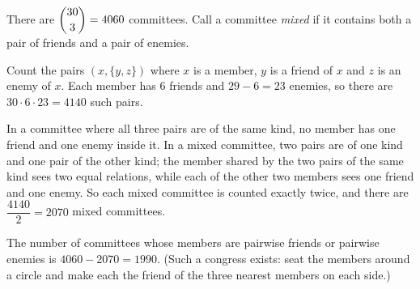 There are $\dbinom{30}{3}=4060$ committees. Call a committee \emph{mixed} if it contains both a pair of friends and a pair of enemies.

Count the pairs $\left(x,\{y,z\}\right)$ where $x$ is a member, $y$ is a friend of $x$ and $z$ is an enemy of $x$. Each member has $6$ friends and $29-6=23$ enemies, so there are $30\cdot6\cdot23=4140$ such pairs.

In a committee where all three pairs are of the same kind, no member has one friend and one enemy inside it. In a mixed committee, two pairs are of one kind and one pair of the other kind; the member shared by the two pairs of the same kind sees two equal relations, while each of the other two members sees one friend and one enemy. So each mixed committee is counted exactly twice, and there are $\dfrac{4140}{2}=2070$ mixed committees.

The number of committees whose members are pairwise friends or pairwise enemies is $4060-2070=\boxed{1990}$. (Such a congress exists: seat the members around a circle and make each the friend of the three nearest members on each side.)
